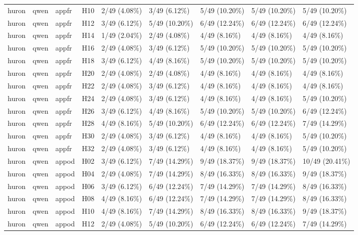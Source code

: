\begin{longtable}{lllllllll}
huron & qwen & appfr & H10 & 2/49 (4.08\%) & 3/49 (6.12\%) & 5/49 (10.20\%) & 5/49 (10.20\%) & 5/49 (10.20\%) \\
huron & qwen & appfr & H12 & 3/49 (6.12\%) & 5/49 (10.20\%) & 6/49 (12.24\%) & 6/49 (12.24\%) & 6/49 (12.24\%) \\
huron & qwen & appfr & H14 & 1/49 (2.04\%) & 2/49 (4.08\%) & 4/49 (8.16\%) & 4/49 (8.16\%) & 4/49 (8.16\%) \\
huron & qwen & appfr & H16 & 2/49 (4.08\%) & 3/49 (6.12\%) & 5/49 (10.20\%) & 5/49 (10.20\%) & 5/49 (10.20\%) \\
huron & qwen & appfr & H18 & 3/49 (6.12\%) & 4/49 (8.16\%) & 5/49 (10.20\%) & 5/49 (10.20\%) & 5/49 (10.20\%) \\
huron & qwen & appfr & H20 & 2/49 (4.08\%) & 2/49 (4.08\%) & 4/49 (8.16\%) & 4/49 (8.16\%) & 4/49 (8.16\%) \\
huron & qwen & appfr & H22 & 2/49 (4.08\%) & 3/49 (6.12\%) & 4/49 (8.16\%) & 4/49 (8.16\%) & 4/49 (8.16\%) \\
huron & qwen & appfr & H24 & 2/49 (4.08\%) & 3/49 (6.12\%) & 4/49 (8.16\%) & 4/49 (8.16\%) & 5/49 (10.20\%) \\
huron & qwen & appfr & H26 & 3/49 (6.12\%) & 4/49 (8.16\%) & 5/49 (10.20\%) & 5/49 (10.20\%) & 6/49 (12.24\%) \\
huron & qwen & appfr & H28 & 4/49 (8.16\%) & 5/49 (10.20\%) & 6/49 (12.24\%) & 6/49 (12.24\%) & 7/49 (14.29\%) \\
huron & qwen & appfr & H30 & 2/49 (4.08\%) & 3/49 (6.12\%) & 4/49 (8.16\%) & 4/49 (8.16\%) & 5/49 (10.20\%) \\
huron & qwen & appfr & H32 & 2/49 (4.08\%) & 3/49 (6.12\%) & 4/49 (8.16\%) & 4/49 (8.16\%) & 5/49 (10.20\%) \\
huron & qwen & appod & H02 & 3/49 (6.12\%) & 7/49 (14.29\%) & 9/49 (18.37\%) & 9/49 (18.37\%) & 10/49 (20.41\%) \\
huron & qwen & appod & H04 & 2/49 (4.08\%) & 7/49 (14.29\%) & 8/49 (16.33\%) & 8/49 (16.33\%) & 9/49 (18.37\%) \\
huron & qwen & appod & H06 & 3/49 (6.12\%) & 6/49 (12.24\%) & 7/49 (14.29\%) & 7/49 (14.29\%) & 8/49 (16.33\%) \\
huron & qwen & appod & H08 & 4/49 (8.16\%) & 6/49 (12.24\%) & 7/49 (14.29\%) & 7/49 (14.29\%) & 8/49 (16.33\%) \\
huron & qwen & appod & H10 & 4/49 (8.16\%) & 7/49 (14.29\%) & 8/49 (16.33\%) & 8/49 (16.33\%) & 9/49 (18.37\%) \\
huron & qwen & appod & H12 & 2/49 (4.08\%) & 5/49 (10.20\%) & 6/49 (12.24\%) & 6/49 (12.24\%) & 7/49 (14.29\%) \\

\end{longtable}
